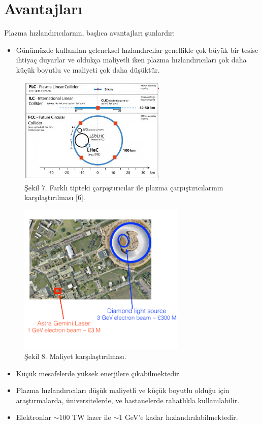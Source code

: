 \documentclass{article}
\begin{document}
\section{Avantajları}
Plazma hızlandırıcılarnın, başlıca avantajları şunlardır: 
\begin{itemize}
    \item Günümüzde kullanılan geleneksel hızlandırcılar genellikle çok büyük bir tesise ihtiyaç duyarlar ve oldukça maliyetli iken plazma hızlandırıcıları çok daha küçük boyutlu ve maliyeti çok daha düşüktür.
\end{itemize}
 \begin{figure}[h]
 \centering
\includegraphics[width=7cm]{index.png}
\caption*{Şekil 7. Farklı tipteki çarpıştırıcılar ile plazma çarpıştırıcılarının karşılaştırılması [6].}
	\end{figure}
	\begin{figure}[h]
 \centering
\includegraphics[width=8cm]{maliyet.png}
\caption*{Şekil 8. Maliyet karşılaştırılması.}
	\end{figure}
	\begin{itemize}
	    \item Küçük mesafelerde yüksek enerjilere çıkabilmektedir.
	\end{itemize}
\begin{itemize}
    \item Plazma hızlandırıcıları düşük maliyetli ve küçük boyutlu olduğu için araştırmalarda, üniversitelerde, ve hastanelerde rahatlıkla kullanılabilir.
\end{itemize}
\begin{itemize}
    \item Elektronlar $ \sim 100$ TW lazer ile $ \sim 1$ GeV'e kadar hızlandırılabilmektedir.
\end{itemize}
\end{document}
